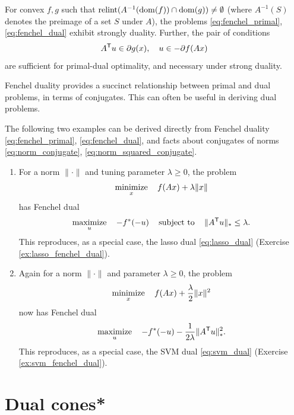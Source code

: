 \begin{Corollary}
\label{cor:fenchel_dual}
For convex $f,g$ such that $\operatorname{relint}(A^{-1}(\operatorname{dom}(f)) \cap \operatorname{dom}(g)) \not=
\emptyset$ (where $A^{-1}(S)$ denotes the preimage of a set $S$ under $A$), the
problems \eqref{eq:fenchel_primal}, \eqref{eq:fenchel_dual} exhibit strongly 
duality. Further, the pair of conditions
\[
A^{\mathsf{T}} u \in \partial g(x), \quad u \in - \partial f(Ax)
\]
are sufficient for primal-dual optimality, and necessary under strong duality.   
\end{Corollary}

Fenchel duality provides a succinct relationship between primal and dual
problems, in terms of conjugates. This can often be useful in deriving dual
problems.

\begin{Example}
The following two examples can be derived directly from Fenchel duality
\eqref{eq:fenchel_primal}, \eqref{eq:fenchel_dual}, and facts about conjugates
of norms \eqref{eq:norm_conjugate}, \eqref{eq:norm_squared_conjugate}.

\begin{enumerate}[label=\alph*., ref=\alph*]
\item {}
For a norm $\|\cdot\|$ and tuning parameter $\lambda \geq 0$, the problem    
\[
\operatorname*{minimize}_x \quad f(Ax) + \lambda \|x\| 
\]
has Fenchel dual 
\[
\operatorname*{maximize}_u \quad -f^*(-u) \quad \operatorname{subject\,\,to} \quad \|A^{\mathsf{T}} u\|_* \leq \lambda.        
\]
This reproduces, as a special case, the lasso dual \eqref{eq:lasso_dual} (Exercise
\ref{ex:lasso_fenchel_dual}). 

\item {}
Again for a norm $\|\cdot\|$ and parameter $\lambda \geq 0$, the problem   
\[
\operatorname*{minimize}_x \quad f(Ax) + \frac{\lambda}{2} \|x\|^2
\]
now has Fenchel dual 
\[
\operatorname*{maximize}_u \quad -f^*(-u) - \frac{1}{2\lambda} \|A^{\mathsf{T}} u\|_*^2. 
\]
This reproduces, as a special case, the SVM dual \eqref{eq:svm_dual} (Exercise
\ref{ex:svm_fenchel_dual}). 
\end{enumerate}
\end{Example}

\section{Dual cones*}
\label{sec:dual_cones}

